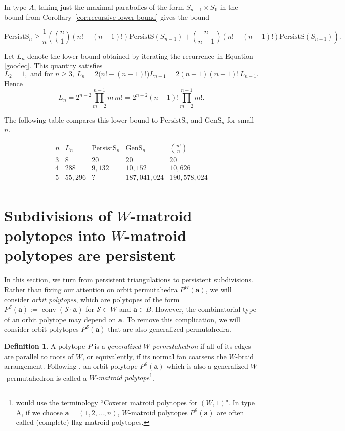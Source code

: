 \documentclass{amsart}
\theoremstyle{definition}
\newtheorem{defn}[thm]{Definition}
\def\ba{\mathbf{a}}
\def\wperm_#1{P^W(#1)}
\def\cS{\mathcal{S}}
\DeclareMathOperator{\conv}{conv}
\def\gsimp{\mathrm{GenS}}
\def\psimp{\mathrm{PersistS}}
\begin{document}
In type $A$, taking just the maximal parabolics of the form $S_{n-1} \times S_1$ in the bound from Corollary~\ref{cor:recursive-lower-bound} gives the bound

\begin{equation} \label{goodeq}
\psimp_n
 \ge \frac{1}{n}\left( \binom{n}{1}
\left(n!-(n-1)!\right)
\psimp(S_{n-1}) + \binom{n}{n-1}
\left(n!-(n-1)!\right)
\psimp(S_{n-1})\right).
\end{equation} 


Let \(L_n\) denote the lower bound obtained by iterating the recurrence in Equation \ref{goodeq}.
This quantity satisfies
\[
L_2=1, \text{ and for }n \ge 3,~ L_n
=
2\bigl(n!-(n-1)!\bigr)L_{n-1}=
2(n-1)(n-1)!\,L_{n-1}.
\]
Hence
\[
L_n
=
2^{n-2}\prod_{m=2}^{n-1} m\,m!
=
2^{n-2}(n-1)!\prod_{m=2}^{n-1} m!.
\]

The following table compares this lower bound to $\psimp_n$ and $\gsimp_n$ for small $n$. 

\[
\begin{array}{c|r|r|r|r}
n & L_n & \psimp_n & \gsimp_n & \binom{n!}{n} \\
\hline
3 & 8 & 20 & 20 & 20\\
4 & 288 & 9{,}132 & 10{,}152 & 10{,}626\\
5 & 55{,}296 & ? & 187{,}041{,}024 & 190{,}578{,}024\\
\end{array}
\]

\section{Subdivisions of $W$-matroid polytopes into $W$-matroid polytopes are persistent}\label{sec:matroidal-subdivisions}

In this section, we turn from persistent triangulations to persistent subdivisions. Rather than fixing our attention on orbit permutahedra $\wperm_\ba$, we will consider \emph{orbit polytopes}, which are polytopes of the form $P^\cS(\ba):=\conv(\cS \cdot \ba)$ for $\cS \subset W$ and $\ba \in B$. However, the combinatorial type of an orbit polytope may depend on $\ba$. To remove this complication, we will consider orbit polytopes $P^\cS(\ba)$ that are also generalized permutahedra.

\begin{defn}
    A polytope $P$ is a \emph{generalized $W$-permutahedron} if all of its edges are parallel to roots of $W$, or equivalently, if its normal fan coarsens the $W$-braid arrangement. Following \cite[Section 6.4]{BGW}, an orbit polytope $P^\cS(\ba)$ which is also a generalized $W$-permutahedron is called a \emph{$W$-matroid polytope}\footnote{ \cite{BGW} would use the terminology ``Coxeter matroid polytopes for $(W, 1)$". In type A, if we choose $\ba=(1,2, \dots, n)$, $W$-matroid polytopes $P^{\cS}(\ba)$ are often called (complete) flag matroid polytopes.}.
\end{defn}
\end{document}
